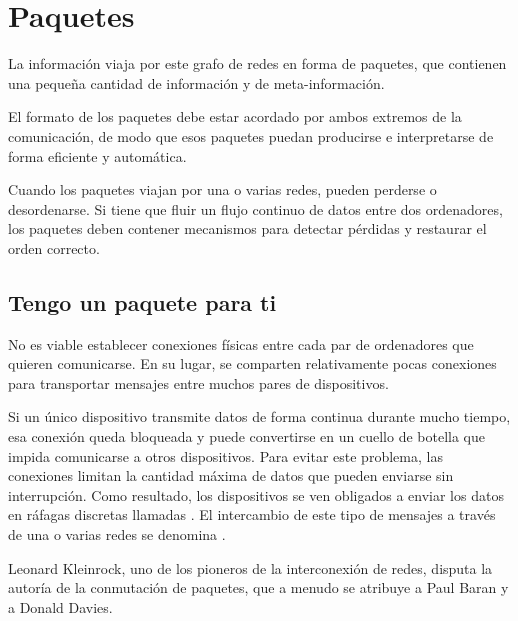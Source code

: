 
\chapter{Paquetes}\label{sec:packets}

La información viaja por este grafo de redes en forma de paquetes, que contienen una pequeña cantidad de 
información y de meta-información. 

El formato de los paquetes debe estar acordado por ambos extremos de la comunicación, de modo que esos paquetes puedan 
producirse e interpretarse de forma eficiente y automática.

Cuando los paquetes viajan por una o varias redes, pueden perderse o desordenarse. Si tiene que fluir un flujo continuo de datos 
entre dos ordenadores, los paquetes deben contener mecanismos para detectar pérdidas y restaurar el orden correcto.

\section{Tengo un paquete para ti}\label{sec:packets:lan_wan}

No es viable establecer conexiones físicas entre cada par de ordenadores que quieren comunicarse.
En su lugar, se comparten relativamente pocas conexiones para transportar mensajes entre muchos pares de dispositivos.

Si un único dispositivo transmite datos de forma continua durante mucho tiempo, esa conexión queda bloqueada y puede convertirse en un cuello de botella que 
impida comunicarse a otros dispositivos. Para evitar este problema, las conexiones limitan la cantidad máxima de datos
que pueden enviarse sin interrupción. Como resultado, los dispositivos se ven obligados a enviar los datos en ráfagas discretas llamadas 
. El intercambio de este tipo de mensajes a través de una o varias redes se denomina
.

\begin{remark}
%  
% 

Leonard Kleinrock, uno de los pioneros de la interconexión de redes, disputa la autoría de la conmutación de paquetes,
que a menudo se atribuye a Paul Baran y a Donald Davies.
\end{remark}

